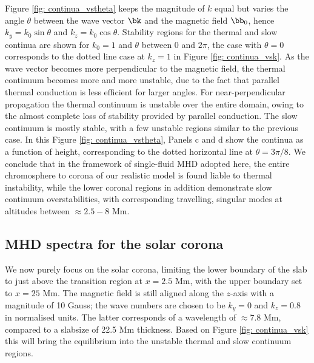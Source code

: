 Figure \ref{fig: continua_vstheta} keeps the magnitude of $k$ equal but varies the angle $\theta$ between the wave vector $\bk$ and the magnetic field $\bb_0$, hence $k_y = k_0\sin\theta$ and $k_z = k_0\cos\theta$. Stability regions for the thermal and slow continua are shown for $k_0 = 1$ and $\theta$ between 0 and $2\pi$, the case with $\theta = 0$ corresponds to the dotted line case at $k_z = 1$ in Figure \ref{fig: continua_vsk}. As the wave vector becomes more perpendicular to the magnetic field, the thermal continuum becomes more and more unstable, due to the fact that parallel thermal conduction is less efficient for larger angles. For near-perpendicular propagation the thermal continuum is unstable over the entire domain, owing to the almost complete loss of stability provided by parallel conduction. The slow continuum is mostly stable, with a few unstable regions similar to the previous case. In this Figure \ref{fig: continua_vstheta}, Panels c and d show the continua as a function of height, corresponding to the dotted horizontal line at $\theta = 3\pi/8$. We conclude that in the framework of single-fluid MHD adopted here, the entire chromosphere to corona of our realistic model is found liable to thermal instability, while the lower coronal regions in addition demonstrate slow continuum overstabilities, with corresponding travelling, singular modes at altitudes between $\approx 2.5-8$ Mm.



\subsection{MHD spectra for the solar corona} \label{ss: corona_spectra}
We now purely focus on the solar corona, limiting the lower boundary of the slab to just above the transition region at $x = 2.5$ Mm, with the upper boundary set to $x = 25$ Mm. The magnetic field is still aligned along the $z$-axis with a magnitude of 10 Gauss; the wave numbers are chosen to be $k_y = 0$ and $k_z = 0.8$ in normalised units. The latter corresponds of a wavelength of $\approx 7.8$ Mm, compared to a slabsize of 22.5 Mm thickness. Based on Figure \ref{fig: continua_vsk} this will bring the equilibrium into the unstable thermal and slow continuum regions.

